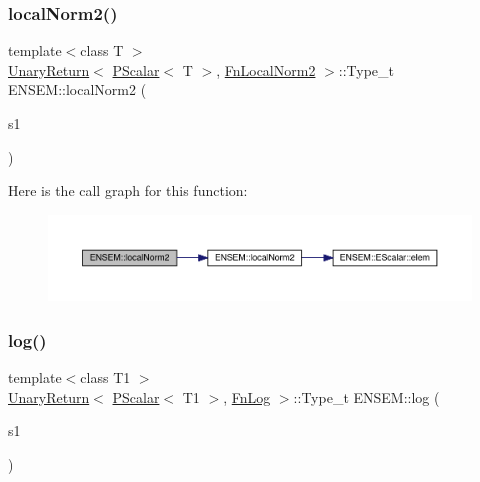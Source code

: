 \subsubsection{\texorpdfstring{localNorm2()}{localNorm2()}}
{\footnotesize\ttfamily template$<$class T $>$ \\
\mbox{\hyperlink{structENSEM_1_1UnaryReturn}{Unary\+Return}}$<$ \mbox{\hyperlink{classENSEM_1_1PScalar}{P\+Scalar}}$<$ T $>$, \mbox{\hyperlink{structENSEM_1_1FnLocalNorm2}{Fn\+Local\+Norm2}} $>$\+::Type\+\_\+t E\+N\+S\+E\+M\+::local\+Norm2 (\begin{DoxyParamCaption}\item[{const \mbox{\hyperlink{classENSEM_1_1PScalar}{P\+Scalar}}$<$ T $>$ \&}]{s1 }\end{DoxyParamCaption})\hspace{0.3cm}{\ttfamily [inline]}}

Here is the call graph for this function\+:\nopagebreak
\begin{figure}[H]
\begin{center}
\leavevmode
\includegraphics[width=350pt]{db/dcc/group__primscalar_ga21e7b79db399d760e036194c689a5291_cgraph}
\end{center}
\end{figure}
\mbox{\label{group__primscalar_ga4793657c8e42b217f973ede3c83b71d7}} 
\subsubsection{\texorpdfstring{log()}{log()}}
{\footnotesize\ttfamily template$<$class T1 $>$ \\
\mbox{\hyperlink{structENSEM_1_1UnaryReturn}{Unary\+Return}}$<$ \mbox{\hyperlink{classENSEM_1_1PScalar}{P\+Scalar}}$<$ T1 $>$, \mbox{\hyperlink{structENSEM_1_1FnLog}{Fn\+Log}} $>$\+::Type\+\_\+t E\+N\+S\+E\+M\+::log (\begin{DoxyParamCaption}\item[{const \mbox{\hyperlink{classENSEM_1_1PScalar}{P\+Scalar}}$<$ T1 $>$ \&}]{s1 }\end{DoxyParamCaption})\hspace{0.3cm}{\ttfamily [inline]}}

